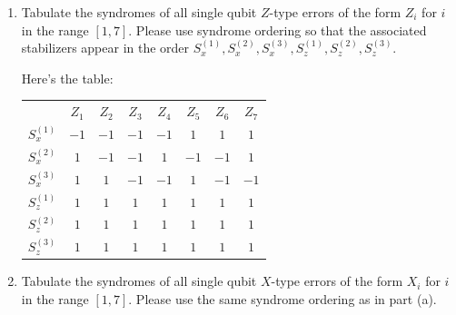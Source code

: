 \documentclass[10pt]{article}
\begin{document}
	\begin{enumerate}[label=\alph*)]
		\item Tabulate the syndromes of all single qubit \( Z \)-type errors of the form \( Z_i \) for \( i \) in the 
			range \( [1, 7]\). Please use syndrome ordering so that the associated stabilizers appear in the order 
			\( S_x^{(1)}, S_x^{(2)}, S_x^{(3)}, S_z^{(1)}, S_z^{(2)}, S_z^{(3)} \). 

			\begin{solution}
				Here's the table:
				\begin{center}
					\begin{tabular}{c|c|c|c|c|c|c|c}
						&  \( Z_1 \) & \( Z_2 \) & \( Z_3 \) & \( Z_4 \) & \( Z_5 \) & \( Z_6 \) & \( Z_7 \) \\
						\( S_x^{(1)} \) & \( -1 \) & \( -1 \) & \( -1 \) & \( -1 \) & \( 1 \) & \( 1 \) & $1$ \\
						\( S_x^{(2)} \) & \( 1 \) & \( -1 \) &  \( -1 \) & \( 1 \) & \( -1 \) & \( -1 \) & \( 1 \) \\
						\( S_x^{(3)} \) & \( 1 \) & \( 1 \) & \( -1 \) &  \( -1 \) & \( 1 \) & \( -1  \) & \( -1 \)\\
						\( S_z^{(1)} \) & \( 1 \) & \( 1 \) & \( 1 \) & \( 1 \) & \( 1 \) & \( 1 \) & \( 1 \)\\
						\( S_z^{(2)} \) & \( 1 \) & \( 1 \) & \( 1 \) & \( 1 \) & \( 1 \) & \( 1 \) & \( 1 \)\\
						\( S_z^{(3)} \) & \( 1 \) & \( 1 \) & \( 1 \) & \( 1 \) & \( 1 \) & \( 1 \) & \( 1 \)
					\end{tabular}
				\end{center}
			\end{solution}
		\item Tabulate the syndromes of all single qubit \( X \)-type errors of the form \( X_i \) for 
			\( i \) in the range \( [1, 7] \). Please use the same syndrome ordering as in part (a). 


\end{enumerate}
\end{document}
